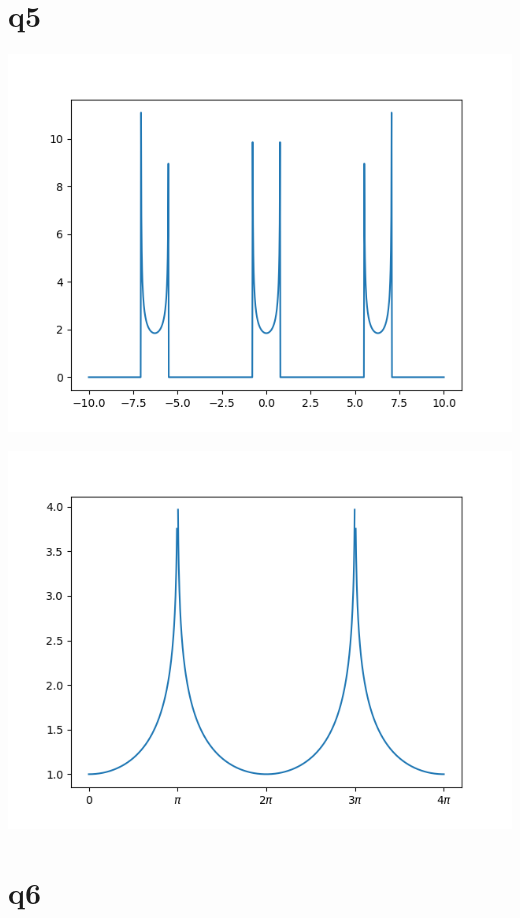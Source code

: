 \documentclass[a4paper,english]{article}
\begin{document}
    \section{q5}
    \begin{center}
        \includegraphics[scale=0.8]{./3_5.png}
    \end{center}
    \begin{center}
        \includegraphics[scale=0.8]{./3_6.png}
    \end{center}
    \section{q6}
    
\end{document}

